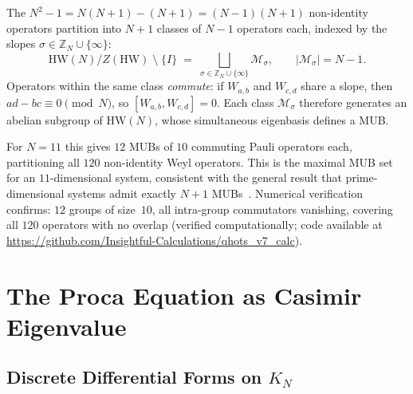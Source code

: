 \documentclass[aip,jmp,reprint,superscriptaddress,floatfix,nofootinbib]{revtex4-2}
\theoremstyle{definition}
\theoremstyle{remark}
\newcommand{\ZN}{\mathbb{Z}_N}
\newcommand{\HW}{\mathrm{HW}}
\begin{document}
The $N^2 - 1 = N(N{+}1) - (N{+}1) = (N{-}1)(N{+}1)$ non-identity
operators partition into $N + 1$ classes of $N - 1$ operators each,
indexed by the slopes $\sigma \in \ZN \cup \{\infty\}$:
\begin{equation}\label{eq:mub-partition}
\HW(N)/Z(\HW) \;\setminus\; \{I\}
  \;=\; \bigsqcup_{\sigma \in \ZN \cup \{\infty\}}
  \mathcal{M}_\sigma,
  \qquad |\mathcal{M}_\sigma| = N - 1.
\end{equation}
Operators within the same class \emph{commute}:
if $W_{a,b}$ and $W_{c,d}$ share a slope, then $ad - bc \equiv 0
\pmod{N}$, so $[W_{a,b}, W_{c,d}] = 0$.  Each class
$\mathcal{M}_\sigma$ therefore generates an abelian subgroup of
$\HW(N)$, whose simultaneous eigenbasis defines a MUB.

For $N = 11$ this gives $12$ MUBs of $10$ commuting Pauli operators
each, partitioning all $120$ non-identity Weyl operators.  This is
the maximal MUB set for an $11$-dimensional system, consistent with
the general result that prime-dimensional systems admit exactly
$N + 1$ MUBs~\cite{Gottesman1997}.  Numerical verification confirms: $12$ groups of size~$10$, all
intra-group commutators vanishing, covering all $120$ operators with
no overlap (verified computationally; code available at
\url{https://github.com/Insightful-Calculations/qhots_v7_calc}).

\section{The Proca Equation as Casimir Eigenvalue}
\label{sec:proca}

\subsection{Discrete Differential Forms on \texorpdfstring{$K_N$}{K\_N}}
\label{sec:proca:hodge}
\end{document}
